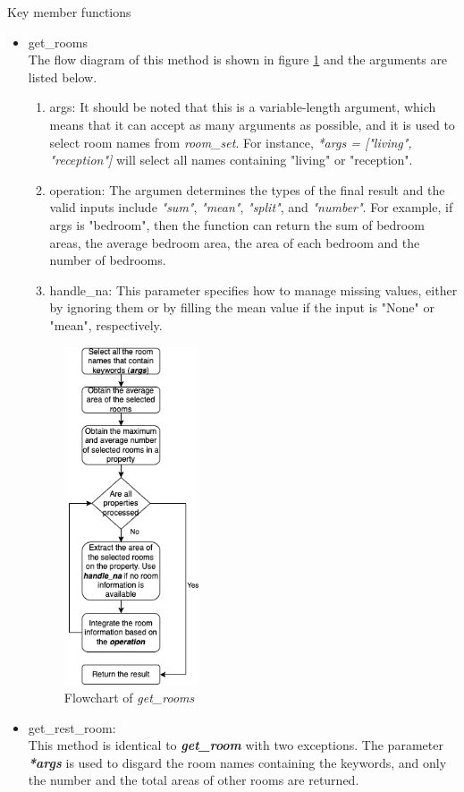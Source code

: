 \documentclass[12pt,twoside]{report}
\begin{document}
Key member functions
\begin{itemize}
	\item get\_rooms \\
	The flow diagram of this method is shown in figure \ref{extract_room_get_rooms} and the arguments are listed below.
	\begin{enumerate}
		\item args: It should be noted that this is a variable-length argument, which means that it can accept as many arguments as possible, and it is used to select room names from \textit{room\_set}. For instance, \textit{*args = ["living", "reception"]} will select all names containing "living" or "reception". 
		\item operation: The argumen determines the types of the final result and the valid inputs include \textit{"sum"}, \textit{"mean"}, \textit{"split"}, and \textit{"number"}. For example, if args is "bedroom", then the function can return the sum of bedroom areas, the average bedroom area, the area of each bedroom and the number of bedrooms. 
		\item handle\_na: This parameter specifies how to manage missing values, either by ignoring them or by filling the mean value if the input is "None" or "mean", respectively. 
	\end{enumerate} 
	\begin{figure}[h]
		\centering
		\includegraphics[height=10cm]{extract_room_get_rooms}
		\caption{Flowchart of \textit{get\_rooms}}
		\label{extract_room_get_rooms}
	\end{figure}
	\item get\_rest\_room: \\
	This method is identical to \textit{\textbf{get\_room}} with two exceptions. The parameter \textit{\textbf{*args}} is used to disgard the room names containing the keywords, and only the number and the total areas of other rooms are returned. 
\end{itemize}
\end{document}

